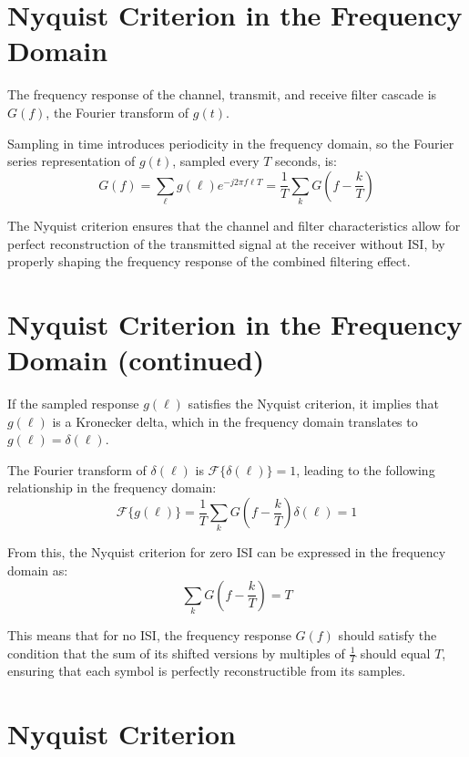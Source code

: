 \section*{Nyquist Criterion in the Frequency Domain}

The frequency response of the channel, transmit, and receive filter cascade is \( G(f) \), the Fourier transform of \( g(t) \). 

Sampling in time introduces periodicity in the frequency domain, so the Fourier series representation of \( g(t) \), sampled every \( T \) seconds, is:
\[ G(f) = \sum_{\ell} g(\ell)e^{-j2\pi f \ell T} = \frac{1}{T} \sum_k G\left(f - \frac{k}{T}\right) \]

The Nyquist criterion ensures that the channel and filter characteristics allow for perfect reconstruction of the transmitted signal at the receiver without ISI, by properly shaping the frequency response of the combined filtering effect.


\section*{Nyquist Criterion in the Frequency Domain (continued)}

If the sampled response \( g(\ell) \) satisfies the Nyquist criterion, it implies that \( g(\ell) \) is a Kronecker delta, which in the frequency domain translates to \( g(\ell) = \delta(\ell) \).

The Fourier transform of \( \delta(\ell) \) is \( \mathcal{F}\{\delta(\ell)\} = 1 \), leading to the following relationship in the frequency domain:
\[ \mathcal{F}\{g(\ell)\} = \frac{1}{T} \sum_k G\left(f - \frac{k}{T}\right) \delta(\ell) = 1 \]

From this, the Nyquist criterion for zero ISI can be expressed in the frequency domain as:
\[ \sum_k G\left(f - \frac{k}{T}\right) = T \]

This means that for no ISI, the frequency response \( G(f) \) should satisfy the condition that the sum of its shifted versions by multiples of \( \frac{1}{T} \) should equal \( T \), ensuring that each symbol is perfectly reconstructible from its samples.

\section*{Nyquist Criterion}

